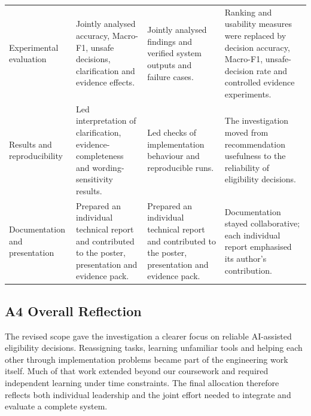 \begin{table}[!ht]
\begin{tabular}{p{27mm}p{43mm}p{43mm}p{49mm}}
Experimental evaluation & Jointly analysed accuracy, Macro-F1, unsafe decisions, clarification and evidence effects. & Jointly analysed findings and verified system outputs and failure cases. & Ranking and usability measures were replaced by decision accuracy, Macro-F1, unsafe-decision rate and controlled evidence experiments.\\
Results and reproducibility & Led interpretation of clarification, evidence-completeness and wording-sensitivity results. & Led checks of implementation behaviour and reproducible runs. & The investigation moved from recommendation usefulness to the reliability of eligibility decisions.\\
Documentation and presentation & Prepared an individual technical report and contributed to the poster, presentation and evidence pack. & Prepared an individual technical report and contributed to the poster, presentation and evidence pack. & Documentation stayed collaborative; each individual report emphasised its author's contribution.\\
\hline
\end{tabular}
\end{table}

\subsection*{A4 Overall Reflection}
The revised scope gave the investigation a clearer focus on reliable AI-assisted eligibility decisions. Reassigning tasks, learning unfamiliar tools and helping each other through implementation problems became part of the engineering work itself. Much of that work extended beyond our coursework and required independent learning under time constraints. The final allocation therefore reflects both individual leadership and the joint effort needed to integrate and evaluate a complete system.

